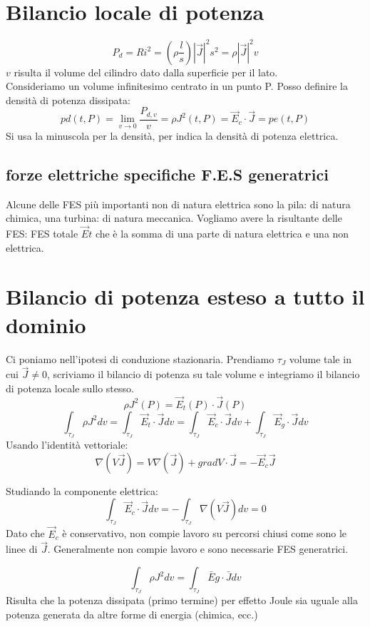 \section{Bilancio locale di potenza}
\[
 P_d = R i^2 = (\rho\frac{l}{s})|\vec J|^2 s^2 = \rho |\vec J|^2v
\]
$v$ risulta il volume del cilindro dato dalla superficie per il lato.\\
Consideriamo un volume infinitesimo centrato in un punto P. Posso definire la densità di potenza dissipata:
\[
pd(t,P) = \lim_{v\to0}\frac{P_{d,v}}{v} = \rho J^2(t,P) = \vec E_c\cdot\vec J = pe(t,P)
\]
Si usa la minuscola per la densità, per indica la densità di potenza elettrica.
\subsection{forze elettriche specifiche F.E.S generatrici}
Alcune delle FES più importanti non di natura elettrica sono la pila: di natura chimica, una turbina: di natura meccanica. Vogliamo avere la risultante delle FES: FES totale $\vec E t$ che è la somma di una parte di natura elettrica e una non elettrica. 

\section{Bilancio di potenza esteso a tutto il dominio}
Ci poniamo nell'ipotesi di conduzione stazionaria. Prendiamo $\tau_J$ volume tale in cui $\vec J \not = 0$, scriviamo il bilancio di potenza su tale volume e integriamo il bilancio di potenza locale sullo stesso.
\[\rho J^2(P) = \vec E_t(P) \cdot \vec J (P)\]
\[
\int_{\tau_J} \rho J^2dv = \int_{\tau_J} \vec E_t \cdot \vec J dv = \int_{\tau_J} \vec E_c \cdot \vec J dv + \int_{\tau_J} \vec E_g \cdot \vec Jdv
\]
Usando l'identità vettoriale:
\[
    \nabla (V\vec J) = V \nabla  (\vec J) +gradV \cdot\vec J = -\vec E_c \vec J
\]

Studiando la componente elettrica:
\[
\int_{\tau_J} \vec E_c \cdot \vec J dv = - \int_{\tau_J}\nabla(V\vec J) dv = 0
\]
Dato che $\vec E_c$ è conservativo, non compie lavoro su percorsi chiusi come sono le linee di $\vec J$. Generalmente non compie lavoro e sono necessarie FES generatrici.

\[
    \int_{\tau_J}\rho J^2dv = \int_{\tau_J}\bar Eg\cdot\bar Jdv 
\]
Risulta che la potenza dissipata (primo termine) per effetto Joule sia uguale alla potenza generata da altre forme di energia (chimica, ecc.)

